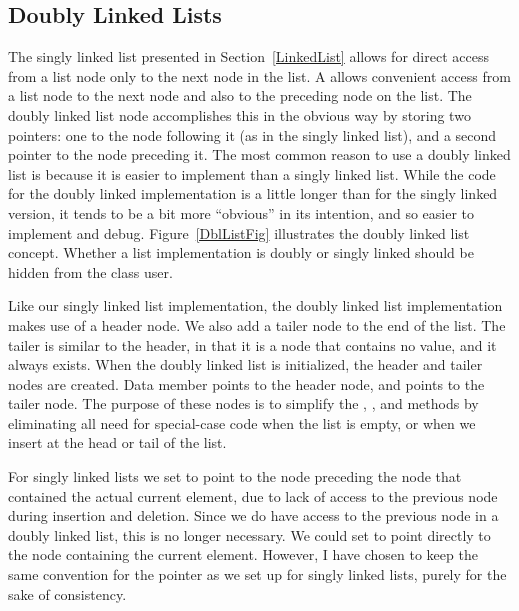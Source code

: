 \subsection{Doubly Linked Lists}
\label{DblList}

The singly linked
list 
presented in Section~\ref{LinkedList} allows
for direct access from a list node only to the next node in the list.
A  allows convenient access from a list node
to the next node and also to the preceding node on the list.
The doubly linked list node accomplishes this in the obvious way by
storing two pointers: one to the node following it (as in the singly
linked list), and a second pointer to the node preceding it.
The most common reason to use a doubly linked list is
because it is easier to implement than a singly linked list.
While the code for the doubly linked implementation is a little longer
than for the singly linked version, it tends to be a bit more
``obvious'' in its intention, and so easier to implement and debug.
Figure~\ref{DblListFig} illustrates the doubly linked list concept.
Whether a list implementation is doubly or singly linked should
be hidden from the  class user.

Like our singly linked list implementation, the doubly linked list
implementation makes use of a header node.
We also add a tailer node to the end of the list.
The tailer is similar to the header, in that it is a node that
contains no value, and it always exists.
When the doubly linked list is initialized, the header and tailer
nodes are created.
Data member  points to the header node, and 
points to the tailer node.
The purpose of these nodes is to simplify the ,
, and  methods by eliminating all need for
special-case code when the list is empty, or when we insert at the
head or tail of the list.

For singly linked lists we set  to point to the node
preceding the node that contained the actual current element, due to
lack of access to the previous node during insertion and deletion.
Since we do have access to the previous node in a doubly linked list,
this is no longer necessary.
We could set  to point directly to the node containing the
current element.
However, I have chosen to keep the same convention for the 
pointer as we set up for singly linked lists, purely for the sake of
consistency.

